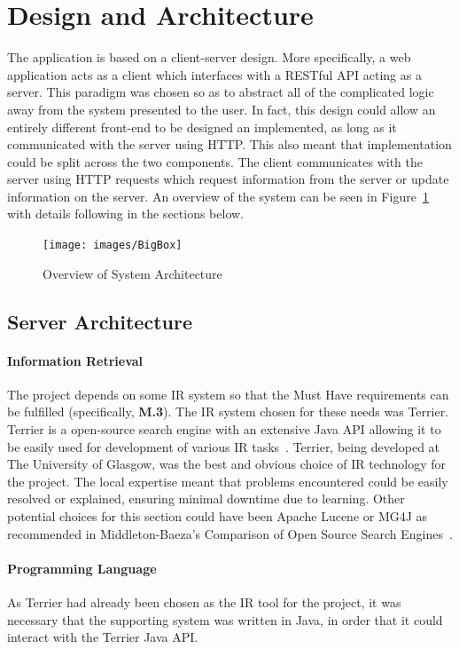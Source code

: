 \documentclass{l4proj}
\begin{document}
\section{Design and Architecture}
The application is based on a client-server design. More specifically, a web application acts as a client which interfaces with a RESTful API acting as a server. This paradigm was chosen so as to abstract all of the complicated logic away from the system presented to the user. In fact, this design could allow an entirely different front-end to be designed an implemented, as long as it communicated with the server using HTTP. This also meant that implementation could be split across the two components.
The client communicates with the server using HTTP requests which request information from the server or update information on the server. An overview of the system can be seen in Figure~\ref{architecture} with details following in the sections below.
\begin{figure}[H]
\centering
\texttt{[image: images/BigBox]}
\caption{Overview of System Architecture}
\label{architecture}
\end{figure}

\subsection{Server Architecture}
\paragraph{Information Retrieval}
The project depends on some IR system so that the Must Have requirements can be fulfilled (specifically, \textbf{M.3}). The IR system chosen for these needs was Terrier. Terrier is a open-source search engine with an extensive Java API allowing it to be easily used for development of various IR tasks~\cite{terrier, macdonald2012puppy}.
Terrier, being developed at The University of Glasgow, was the best and obvious choice of IR technology for the project. The local expertise meant that problems encountered could be easily resolved or explained, ensuring minimal downtime due to learning.
Other potential choices for this section could have been Apache Lucene or MG4J as recommended in Middleton-Baeza's Comparison of Open Source Search Engines~\cite{middleton2007comparison}.
\paragraph{Programming Language}
As Terrier had already been chosen as the IR tool for the project, it was necessary that the supporting system was written in Java, in order that it could interact with the Terrier Java API.
\end{document}
